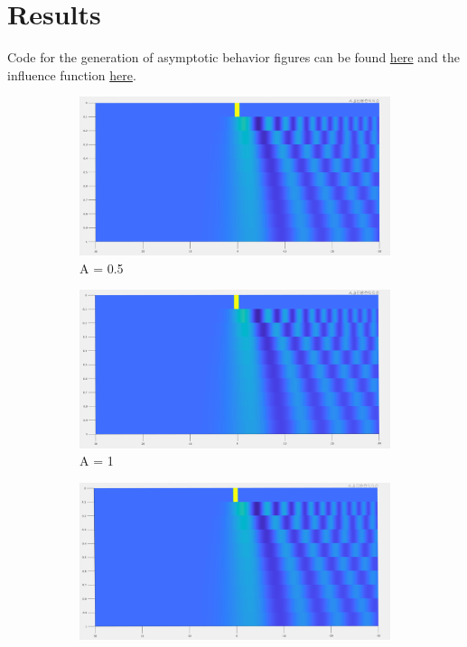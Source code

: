 \documentclass{article}
\begin{document}
\section{Results}
Code for the generation of asymptotic behavior figures can be found \href{https://github.com/Liam-Watson/Analysis-of-mKdV-equation-with-Heaviside-IC/blob/main/asym.m}{here} and the influence function \href{https://github.com/Liam-Watson/Analysis-of-mKdV-equation-with-Heaviside-IC/blob/main/integral.m}{here}.
\begin{figure}[H]
\centering
\begin{subfigure}[b]{85mm}
\includegraphics[scale=0.14]{figures/infl0p5H.png}
\caption{A = 0.5}
\label{fig:}
\end{subfigure}
\begin{subfigure}[b]{85mm}
\includegraphics[scale=0.14]{figures/infl1H.png}
\caption{A = 1}
\label{fig:}
\end{subfigure}
\begin{subfigure}[b]{85mm}
\includegraphics[scale=0.14]{figures/infl1p5H.png}

\end{subfigure}
\end{figure}
\end{document}
